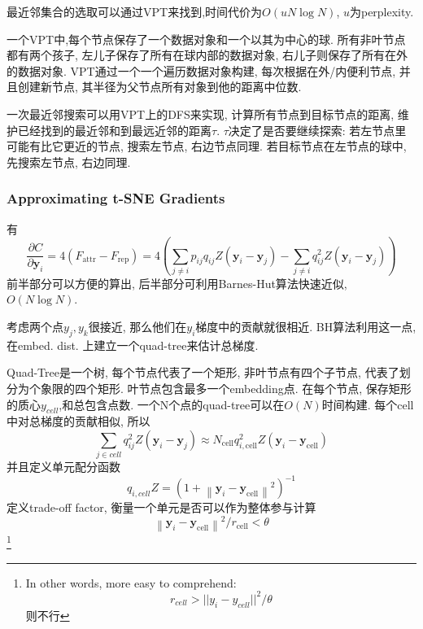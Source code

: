 \documentclass{article}
\begin{document}
最近邻集合的选取可以通过VPT来找到,时间代价为$O(u N\log N)$, $u$为perplexity.

一个VPT中,每个节点保存了一个数据对象和一个以其为中心的球. 所有非叶节点都有两个孩子, 左儿子保存了所有在球内部的数据对象, 右儿子则保存了所有在外的数据对象. VPT通过一个一个遍历数据对象构建, 每次根据在外/内便利节点, 并且创建新节点, 其半径为父节点所有对象到他的距离中位数.

一次最近邻搜索可以用VPT上的DFS来实现, 计算所有节点到目标节点的距离, 维护已经找到的最近邻和到最远近邻的距离$\tau$. $\tau$决定了是否要继续探索: 若左节点里可能有比它更近的节点, 搜索左节点, 右边节点同理. 若目标节点在左节点的球中, 先搜索左节点, 右边同理.

\subsubsection{Approximating t-SNE Gradients}

有
\begin{equation}
    \frac{\partial C}{\partial \mathbf{y}_{i}}=4\left(F_{\text {attr}}-F_{\text {rep}}\right)=4\left(\sum_{j \neq i} p_{i j} q_{i j} Z\left(\mathbf{y}_{i}-\mathbf{y}_{j}\right)-\sum_{j \neq i} q_{i j}^{2} Z\left(\mathbf{y}_{i}-\mathbf{y}_{j}\right)\right)
\end{equation}
前半部分可以方便的算出, 后半部分可利用Barnes-Hut算法快速近似, $O(N \log N)$.

考虑两个点$y_j,y_k$很接近, 那么他们在$y_i$梯度中的贡献就很相近. BH算法利用这一点, 在embed. dist. 上建立一个quad-tree来估计总梯度. 

Quad-Tree是一个树, 每个节点代表了一个矩形, 非叶节点有四个子节点, 代表了划分为个象限的四个矩形. 叶节点包含最多一个embedding点. 在每个节点, 保存矩形的质心$y_{cell}$,和总包含点数. 一个N个点的quad-tree可以在$O(N)$时间构建. 每个cell中对总梯度的贡献相似, 所以
\begin{equation}
    \sum_{j\in cell}q_{i j}^{2} Z\left(\mathbf{y}_{i}-\mathbf{y}_{j}\right)\approx N_{\text {cell}} q_{i, \text {cell}}^{2} Z\left(\mathbf{y}_{i}-\mathbf{y}_{\text {cell}}\right)
\end{equation}
并且定义单元配分函数
\begin{equation}
    q_{i, c e l l} Z=\left(1+\left\|\mathbf{y}_{i}-\mathbf{y}_{\text {cell}}\right\|^{2}\right)^{-1}
\end{equation}
定义trade-off factor, 衡量一个单元是否可以作为整体参与计算
\begin{equation}
    \left\|\mathbf{y}_{i}-\mathbf{y}_{\text {cell}}\right\|^{2} / r_{\text {cell}}<\theta
\end{equation}\footnote{
    In other words, more easy to comprehend:
    $$
    r_{cell}> ||y_i-y_{cell}||^2/\theta
    $$
    则不行
}
\end{document}
